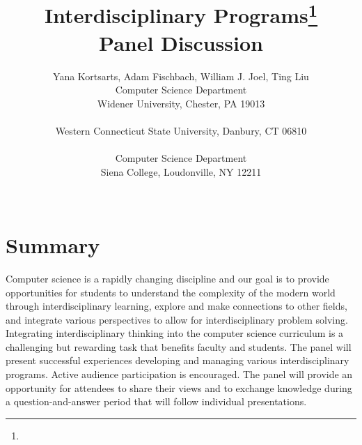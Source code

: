 \documentclass{article}
\title{Interdisciplinary Programs\footnote{\protect}
\\
\vspace{0.2in}
\large Panel Discussion
}
\author{
Yana Kortsarts\affmark[1], Adam Fischbach\affmark[1],  William J. Joel\affmark[2], Ting Liu\affmark[3]\\
\affmark[1]Computer Science Department\\
Widener University, Chester, PA 19013\\
\email{\{ykortsarts,jafischbach\}@widener.edu}\\
\affmark[2]Western Connecticut State University, Danbury, CT 06810\\
\email{joelw@wcsu.edu}\\
\affmark[3]Computer Science Department\\
Siena College, Loudonville, NY 12211\\
\email{tliu@siena.edu}\\
}
\begin{document}
\maketitle

\section{Summary}
Computer science is a rapidly changing discipline and our goal is to provide opportunities for students to understand the complexity of the modern world through interdisciplinary learning, explore and make connections to other fields, and integrate various perspectives to allow for interdisciplinary problem solving. Integrating interdisciplinary thinking into the computer science curriculum is a challenging but rewarding task that benefits faculty and students. The panel will present successful experiences developing and managing various interdisciplinary programs. Active audience participation is encouraged.  The panel will provide an opportunity for attendees to share their views and to exchange knowledge during a question-and-answer period that will follow individual presentations.
\end{document}
